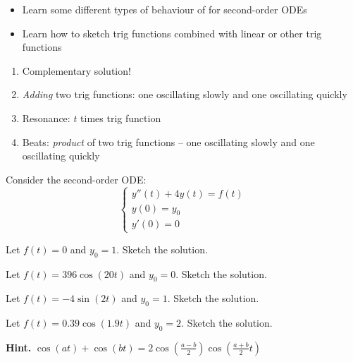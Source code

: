 \begin{annotation}
\begin{goals}
	\begin{itemize}
		\item 	Learn some different types of behaviour of for second-order ODEs
		\item Learn how to sketch trig functions combined with linear or other trig functions
	\end{itemize}
	
	\hfill
	
	\begin{enumerate}[label=.\arabic*.]
		\item Complementary solution!
		\item \emph{Adding} two trig functions: one oscillating slowly and one oscillating quickly
		\item Resonance: $t$ times trig function
		\item Beats: \emph{product} of two trig functions -- one oscillating slowly and one oscillating quickly
	\end{enumerate}
\end{goals}	
\end{annotation}
\question	
	Consider the second-order ODE:
	$$
	\begin{cases}
	y''(t) +4 y(t) = f(t) \\
	y(0)=y_0\\
	y'(0)=0
	\end{cases}
	$$
	
	\begin{parts}
		\item Let $f(t)=0$ and $y_0=1$. Sketch the solution.
		\item Let $f(t)= 396\cos(20t)$ and $y_0=0$. Sketch the solution.

		\item Let $f(t) = -4\sin(2t)$ and $y_0=1$. Sketch the solution.

		\item Let $f(t) = 0.39\cos(1.9t)$ and $y_0=2$. Sketch the solution.
		
		\textbf{Hint. } $\displaystyle \cos(at) + \cos(bt) = 2 \cos\left( \frac{a-b}{2} \right)  \cos\left(\frac{a+b}{2} t \right)$
	\end{parts}



\standardonlynewpage

